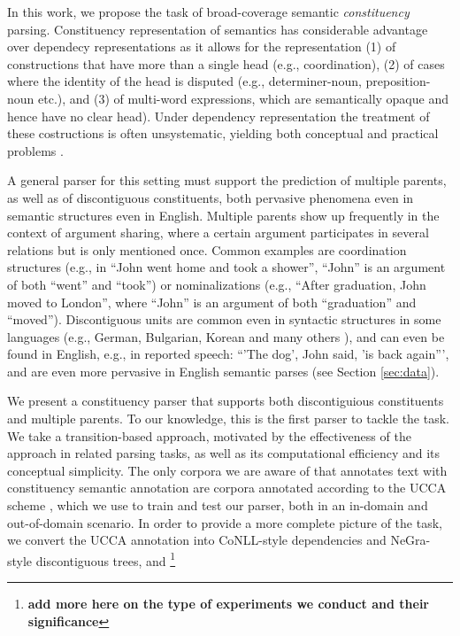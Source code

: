 \documentclass[11pt]{article}
\newcommand{\my}[1]{\footnote{\bf #1}}
\newcommand{\secref}[1]{Section \ref{#1}}
\begin{document}
In this work, we propose the task of broad-coverage semantic {\it constituency} parsing. 
Constituency representation of semantics has considerable advantage over dependecy representations as
it allows for the representation (1) of constructions that have more than a single
head (e.g., coordination), (2) of cases where the identity of the head is disputed
(e.g., determiner-noun, preposition-noun etc.), and (3) of multi-word expressions,
which are semantically opaque and hence have no clear head). Under dependency representation
the treatment of these costructions is often unsystematic, yielding both conceptual
and practical problems \cite{schwartz2011neutralizing,Ivanova2012who,tsarfaty2012cross}.

A general parser for this setting must support the prediction of multiple parents,
as well as of discontiguous constituents, both pervasive phenomena even in semantic
structures even in English. Multiple parents show up frequently in the context of argument
sharing, where a certain argument participates in several relations but is only mentioned once.
Common examples are coordination structures
(e.g., in ``John went home and took a shower'', ``John'' is an argument of both ``went'' and ``took'')
or nominalizations (e.g., ``After graduation, John moved to London'', where ``John'' is an argument
of both ``graduation'' and ``moved'').
Discontiguous units are common even in syntactic structures in some languages (e.g., German, Bulgarian,
Korean and many others \cite{kallmeyer2013data}), and can even be found in English, e.g., in reported
speech: ``'The dog', John said, 'is back again''', and are even more pervasive in English semantic parses
(see \secref{sec:data}).

We present a constituency parser that supports both discontiguious constituents and multiple parents.
To our knowledge, this is the first parser to tackle the task. We take a transition-based approach,
motivated by the effectiveness of the approach in related parsing tasks,
as well as its computational efficiency and its conceptual simplicity.
The only corpora we are aware of that annotates text with constituency semantic annotation are
corpora annotated according to the UCCA scheme \cite{abend2013universal,sulem2015conceptual}, which
we use to train and test our parser, both in an in-domain and out-of-domain scenario.
In order to provide a more complete picture of the task,
we convert the UCCA annotation into CoNLL-style dependencies and NeGra-style discontiguous trees,
and \my{add more here on the type of experiments we conduct and their significance}
\end{document}
